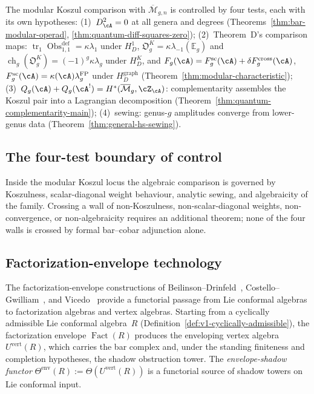\begin{remark}
\label{rem:guide-four-test-interface}
\ClaimStatusConditional
{}
The modular Koszul comparison with $\overline{\mathcal{M}}_{g,n}$ is
controlled by four tests, each with its own hypotheses:
\textup{(1)}~$D_\cA^2 = 0$ at all genera and degrees
\textup{(}Theorems~\textup{\ref{thm:bar-modular-operad},
\ref{thm:quantum-diff-squares-zero}}\textup{)};
\textup{(2)}~Theorem~D's comparison maps:
$\operatorname{tr}_1\operatorname{Obs}^{\mathrm{def}}_{1,1}
=\kappa\lambda_1$ under $H_D^1$,
$\mathfrak O_g^K=\kappa\lambda_{-1}(\mathbb E_g)$ and
$\operatorname{ch}_g(\mathfrak O_g^K)=(-1)^g\kappa\lambda_g$
under $H_D^K$, and
$F_g(\cA)=F_g^{\mathrm{sc}}(\cA)+\delta F_g^{\mathrm{cross}}(\cA)$,
$F_g^{\mathrm{sc}}(\cA)=\kappa(\cA)\lambda_g^{\mathrm{FP}}$
under $H_D^{\mathrm{graph}}$
\textup{(}Theorem~\textup{\ref{thm:modular-characteristic}}\textup{)};
\textup{(3)}~$Q_g(\cA)+Q_g(\cA^!)=H^*(\overline{\mathcal M}_g,\cZ_\cA)$:
complementarity assembles the Koszul pair into a Lagrangian
decomposition
\textup{(}Theorem~\textup{\ref{thm:quantum-complementarity-main}}\textup{)};
\textup{(4)}~sewing: genus-$g$ amplitudes converge from lower-genus data
\textup{(}Theorem~\textup{\ref{thm:general-hs-sewing}}\textup{)}.
\end{remark}

\subsection*{The four-test boundary of control}
\label{subsec:guide-four-test-boundary}

Inside the modular Koszul locus the algebraic comparison is governed
by Koszulness, scalar-diagonal weight behaviour, analytic sewing, and
algebraicity of the family. Crossing a wall of non-Koszulness,
non-scalar-diagonal weights, non-convergence, or non-algebraicity
requires an additional theorem; none of the four walls is crossed by
formal bar--cobar adjunction alone.

\subsection*{Factorization-envelope technology}
\label{sec:guide-nishinaka-vicedo}

The factorization-envelope constructions of
Beilinson--Drinfeld~\cite[\S3.7]{BD04}, Costello--Gwilliam~\cite{CG17},
and Vicedo~\cite{Vicedo25} provide a functorial passage from
Lie conformal algebras to factorization algebras
and vertex algebras. Starting from a cyclically admissible Lie
conformal algebra~$R$ (Definition~\ref{def:v1-cyclically-admissible}),
the factorization envelope $\operatorname{Fact}(R)$ produces the
enveloping vertex algebra $U^{\mathrm{vert}}(R)$, which carries
the bar complex and, under the standing finiteness and completion
hypotheses, the shadow obstruction tower. The
\emph{envelope-shadow functor}
$\Theta^{\mathrm{env}}(R):=\Theta(U^{\mathrm{vert}}(R))$ is a functorial
source of shadow towers on Lie conformal input.

